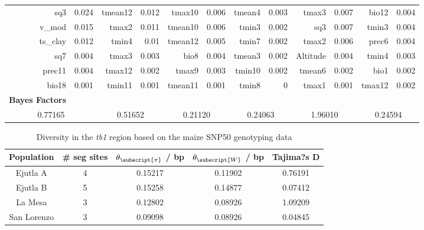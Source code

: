 \documentclass[12pt]{article}
\begin{document}
\begin{table}[htbp]
\begin{tabular}{rrrrrrrrrrrr}
    sq3   & 0.024 & tmean12 & 0.012 & tmax10 & 0.006 & tmean4 & 0.003 & tmax3 & 0.007 & bio12 & 0.004 \\
    v\_mod & 0.015 & tmax2 & 0.011 & tmean10 & 0.006 & tmin3 & 0.002 & sq3   & 0.007 & tmin3 & 0.004 \\
    ts\_clay & 0.012 & tmin4 & 0.01  & tmean12 & 0.005 & tmin7 & 0.002 & tmax2 & 0.006 & prec6 & 0.004 \\
    sq7   & 0.004 & tmax3 & 0.003 & bio8  & 0.004 & tmean3 & 0.002 & Altitude & 0.004 & tmin4 & 0.003 \\
    prec11 & 0.004 & tmax12 & 0.002 & tmax9 & 0.003 & tmin10 & 0.002 & tmean6 & 0.002 & bio1  & 0.002 \\
    bio18 & 0.001 & tmin11 & 0.001 & tmean11 & 0.001 & tmin8 & 0     & tmax1 & 0.001 & tmax12 & 0.002 \\
    \textbf{Bayes Factors} &       &       &       &       &       &       &       &       &       &       &  \\
    \multicolumn{2}{c}{0.77165} & \multicolumn{2}{c}{0.51652} & \multicolumn{2}{c}{0.21120} & \multicolumn{2}{c}{0.24063} & \multicolumn{2}{c}{1.96010} & \multicolumn{2}{c}{0.24594} \\
    \bottomrule
    \end{tabular}%
  \label{TableS3BayEnv}%
\end{table}%

\begin{table}[htbp]
  \centering
  \caption{Diversity in the \emph{tb1} region based on the maize SNP50 genotyping data}
    \begin{tabular}{ccccc}
    \toprule
    \textbf{Population} & \textbf{\# seg sites} & \textbf{$\theta_{\subscript{\pi}}$ / bp} & \textbf{$\theta_{\subscript{W}}$ / bp} & \textbf{Tajima?s D} \\
    \midrule
    Ejutla A & 4     & 0.15217 & 0.11902 & 0.76191 \\
    Ejutla B & 5     & 0.15258 & 0.14877 & 0.07412 \\
    La Mesa & 3     & 0.12802 & 0.08926 & 1.09209 \\
    San Lorenzo & 3     & 0.09098 & 0.08926 & 0.04845 \\
    \bottomrule
    \end{tabular}%
  \label{TableS4DiversitySNP}%
\end{table}%
\end{document}
